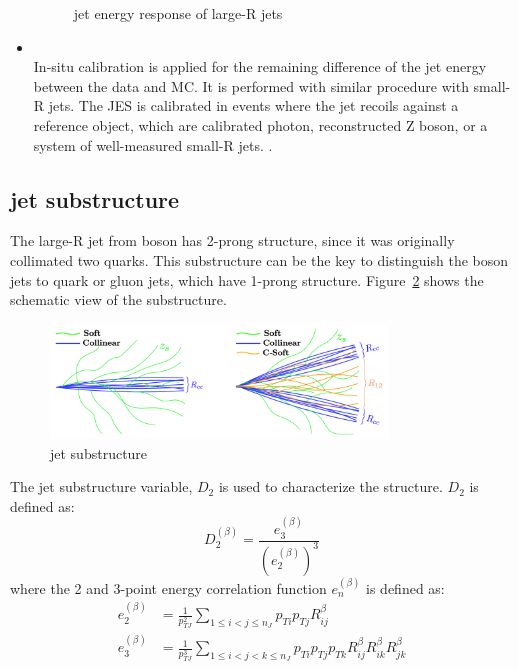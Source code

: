 \begin{itemize}
\begin{figure}[tbp]
\begin{center}
    \caption{
    jet energy response of large-R jets \cite{JETM-2018-02}
    }
    \label{fig:largeRresponse}
    \end{center}
    \end{figure} 
    \item  \textbf{} \\
    In-situ calibration is applied for the remaining difference of the jet energy between the data and MC. It is performed with similar procedure with small-R jets. The JES is calibrated in events where the jet recoils against a reference object, which are calibrated photon, reconstructed Z boson, or a system of well-measured small-R jets. \cite{JETM-2018-02}. 
\end{itemize}

\subsection{jet substructure}
The large-R jet from boson has 2-prong structure, since it was originally collimated two quarks. This substructure can be the key to distinguish the boson jets to quark or gluon jets, which have 1-prong structure.
Figure~\ref{fig:jetsub} shows the schematic view of the substructure.
 \begin{figure}[tbp]
    \begin{center}
    \includegraphics[width=0.80\textwidth,keepaspectratio]{figures/Reconstruction/jetsub}
    \caption{
    jet substructure \cite{Larkoski_2014}
    }
    \label{fig:jetsub}
    \end{center}
    \end{figure}
The jet substructure variable, $D_2$ is used to characterize the structure.  $D_2$ is defined as:
\begin{equation}
D_{2}^{(\beta)}=\frac{e_{3}^{(\beta)}}{\left(e_{2}^{(\beta)}\right)^{3}}
\end{equation}
where the 2 and 3-point energy correlation function $e_{n}^{(\beta)}$ is defined as:
\begin{equation}
\begin{aligned}
e_{2}^{(\beta)} &=\frac{1}{p_{T J}^{2}} \sum_{1 \leq i<j \leq n_{J}} p_{T i} p_{T j} R_{i j}^{\beta} \\
e_{3}^{(\beta)} &=\frac{1}{p_{T J}^{3}} \sum_{1 \leq i<j<k \leq n_{J}} p_{T i} p_{T j} p_{T k} R_{i j}^{\beta} R_{i k}^{\beta} R_{j k}^{\beta}
\end{aligned}
\end{equation}
